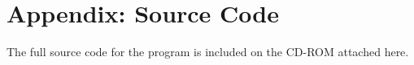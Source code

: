 \chapter*{Appendix: Source Code}
The full source code for the program is included on the CD-ROM attached here.
